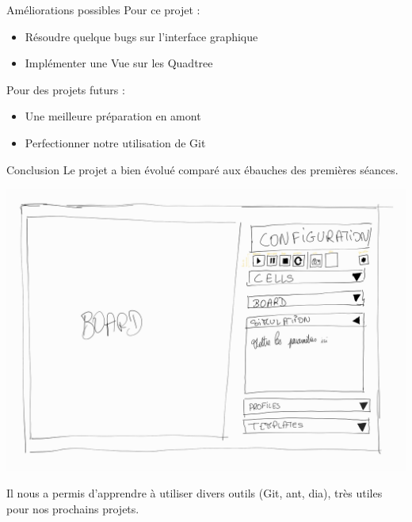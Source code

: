 \documentclass{beamer}
\begin{document}
	\begin{frame}{Améliorations possibles}
		Pour ce projet : 
		\begin{itemize}
			\item Résoudre quelque bugs sur l'interface graphique
			\item Implémenter une Vue sur les Quadtree
		\end{itemize}
		\vspace{0.4in}
		Pour des projets futurs : 
		\begin{itemize}
			\item Une meilleure préparation en amont
			\item Perfectionner notre utilisation de Git 
		\end{itemize}
	\end{frame}
	
	\begin{frame}{Conclusion}
		Le projet a bien évolué comparé aux ébauches des premières séances.
		\begin{center}
			\includegraphics[height=0.4\textheight]{image/ebauche.jpg}	
		\end{center}
		Il nous a permis d'apprendre à utiliser divers outils (Git, ant, dia), très utiles pour nos prochains projets.
		
	\end{frame}
	
\end{document}

